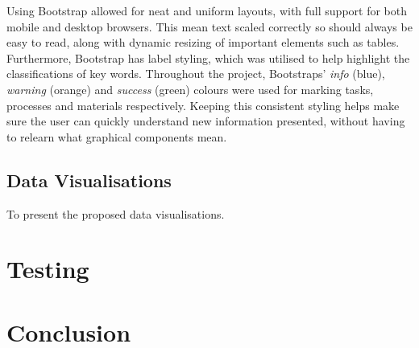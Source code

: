 Using Bootstrap allowed for neat and uniform layouts, with full support for both mobile and desktop browsers. This mean text scaled correctly so should always be easy to read, along with dynamic resizing of important elements such as tables. Furthermore, Bootstrap has label styling, which was utilised to help highlight the classifications of key words. Throughout the project, Bootstraps' \textit{info} (blue), \textit{warning} (orange) and \textit{success} (green) colours were used for marking tasks, processes and materials respectively. Keeping this consistent styling helps make sure the user can quickly understand new information presented, without having to relearn what graphical components mean.

\subsection*{Data Visualisations}
To present the proposed data visualisations. 

\section{Testing}

\section{Conclusion}
